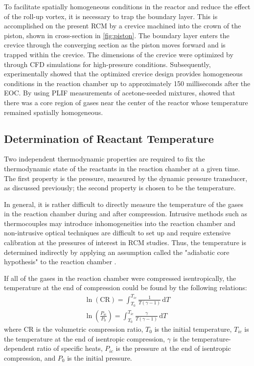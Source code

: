 \documentclass[12pt, letterpaper]{article}
\begin{document}
To facilitate spatially homogeneous conditions in the reactor
and reduce the effect of the roll-up vortex, it is necessary to trap
the boundary layer. This is accomplished on the present RCM by a
crevice machined into the crown of the piston, shown in cross-section
in \autoref{fig:piston}. The boundary layer enters the crevice through
the converging section as the piston moves forward and is trapped
within the crevice. The dimensions of the crevice were optimized
by \textcite{Mittal2006a} through CFD simulations for high-pressure
conditions. Subsequently, \textcite{Mittal2006b} experimentally showed that
the optimized crevice design provides homogeneous conditions in the
reaction chamber up to approximately 150 milliseconds after the EOC.
By using PLIF measurements of acetone-seeded mixtures,
\textcite{Mittal2006b} showed that there was a core region of gases
near the center of the reactor whose temperature remained spatially
homogeneous.

\subsection{Determination of Reactant Temperature}

Two independent thermodynamic properties are required to fix the
thermodynamic state of the reactants in the reaction chamber at a
given time. The first property is the pressure, measured by the dynamic
pressure transducer, as discussed previously; the second property
is chosen to be the temperature.

In general, it is rather difficult to directly measure the temperature
of the gases in the reaction chamber during and after compression.
Intrusive methods such as thermocouples may introduce inhomogeneities into
the reaction chamber and non-intrusive optical techniques are difficult to set up
and require extensive calibration at the pressures of interest in RCM
studies. Thus, the temperature is determined indirectly by applying an
assumption called the "adiabatic core hypothesis" to the reaction chamber
\cite{Mittal2007, Lee1998}.

If all of the gases in the reaction chamber were compressed isentropically,
the temperature at the end of compression could be found by the
following relations:
%
\begin{subequations}
\label{eq:tic}
\begin{align}
\ln\left(\text{CR}\right) = \int_{T_0}^{T_{ic}} \! \frac{1}{T\left(\gamma-1\right)} \, \mathrm{d} T \\
\ln\left(\frac{P_{ic}}{P_0}\right) = \int_{T_0}^{T_{ic}} \! \frac{\gamma}{T\left(\gamma-1\right)} \, \mathrm{d} T
\end{align}
\end{subequations}
%
where CR is the volumetric compression ratio, $T_0$ is the initial temperature,
$T_{ic}$ is the temperature at the end of isentropic compression, $\gamma$ is the
temperature-dependent ratio of specific heats, $P_{ic}$ is the pressure at the
end of isentropic compression, and $P_0$ is the initial pressure.
\end{document}
